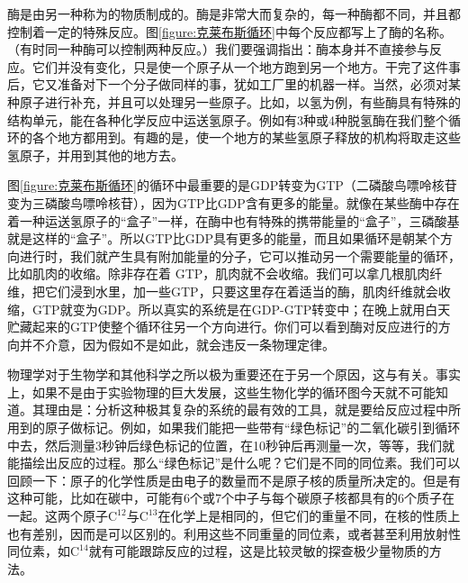 酶是由另一种称为的物质制成的。酶是非常大而复杂的，每一种酶都不同，并且都控制着一定的特殊反应。图\ref{figure:克莱布斯循环}中每个反应都写上了酶的名称。（有时同一种酶可以控制两种反应。）我们要强调指出：酶本身并不直接参与反应。它们并没有变化，只是使一个原子从一个地方跑到另一个地方。干完了这件事后，它又准备对下一个分子做同样的事，犹如工厂里的机器一样。当然，必须对某种原子进行补充，并且可以处理另一些原子。比如，以氢为例，有些酶具有特殊的结构单元，能在各种化学反应中运送氢原子。例如有3种或4种脱氢酶在我们整个循环的各个地方都用到。有趣的是，使一个地方的某些氢原子释放的机构将取走这些氢原子，并用到其他的地方去。

图\ref{figure:克莱布斯循环}的循环中最重要的是GDP转变为GTP（二磷酸鸟嘌呤核苷变为三磷酸鸟嘌呤核苷），因为GTP比GDP含有更多的能量。就像在某些酶中存在着一种运送氢原子的“盒子”一样，在酶中也有特殊的携带能量的“盒子”，三磷酸基就是这样的“盒子”。所以GTP比GDP具有更多的能量，而且如果循环是朝某个方向进行时，我们就产生具有附加能量的分子，它可以推动另一个需要能量的循环，比如肌肉的收缩。除非存在着 GTP，肌肉就不会收缩。我们可以拿几根肌肉纤维，把它们浸到水里，加一些GTP，只要这里存在着适当的酶，肌肉纤维就会收缩，GTP就变为GDP。所以真实的系统是在GDP-GTP转变中；在晚上就用白天贮藏起来的GTP使整个循环往另一个方向进行。你们可以看到酶对反应进行的方向并不介意，因为假如不是如此，就会违反一条物理定律。

物理学对于生物学和其他科学之所以极为重要还在于另一个原因，这与有关。事实上，如果不是由于实验物理的巨大发展，这些生物化学的循环图今天就不可能知道。其理由是：分析这种极其复杂的系统的最有效的工具，就是要给反应过程中所用到的原子做标记。例如，如果我们能把一些带有“绿色标记”的二氧化碳引到循环中去，然后测量3秒钟后绿色标记的位置，在10秒钟后再测量一次，等等，我们就能描绘出反应的过程。那么“绿色标记”是什么呢？它们是不同的同位素。我们可以回顾一下：原子的化学性质是由电子的数量而不是原子核的质量所决定的。但是有这种可能，比如在碳中，可能有6个或7个中子与每个碳原子核都具有的6个质子在一起。这两个原子$\mathrm{C}^{12}$与$\mathrm{C}^{13}$在化学上是相同的，但它们的重量不同，在核的性质上也有差别，因而是可以区别的。利用这些不同重量的同位素，或者甚至利用放射性同位素，如$\mathrm{C}^{14}$就有可能跟踪反应的过程，这是比较灵敏的探查极少量物质的方法。

